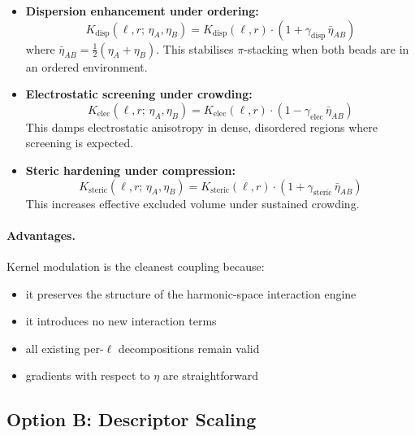 \documentclass[11pt]{article}
\begin{document}
\begin{itemize}
    \item \textbf{Dispersion enhancement under ordering:}
    \begin{equation}
        K_{\mathrm{disp}}(\ell, r;\, \eta_A, \eta_B)
        = K_{\mathrm{disp}}(\ell, r)
        \cdot \left(1 + \gamma_{\mathrm{disp}}\,
        \bar{\eta}_{AB}\right)
    \end{equation}
    where $\bar{\eta}_{AB} = \tfrac{1}{2}(\eta_A + \eta_B)$.
    This stabilises $\pi$-stacking when both beads are in an ordered
    environment.

    \item \textbf{Electrostatic screening under crowding:}
    \begin{equation}
        K_{\mathrm{elec}}(\ell, r;\, \eta_A, \eta_B)
        = K_{\mathrm{elec}}(\ell, r)
        \cdot \left(1 - \gamma_{\mathrm{elec}}\,
        \bar{\eta}_{AB}\right)
    \end{equation}
    This damps electrostatic anisotropy in dense, disordered regions
    where screening is expected.

    \item \textbf{Steric hardening under compression:}
    \begin{equation}
        K_{\mathrm{steric}}(\ell, r;\, \eta_A, \eta_B)
        = K_{\mathrm{steric}}(\ell, r)
        \cdot \left(1 + \gamma_{\mathrm{steric}}\,
        \bar{\eta}_{AB}\right)
    \end{equation}
    This increases effective excluded volume under sustained crowding.
\end{itemize}

\paragraph{Advantages.}
Kernel modulation is the cleanest coupling because:
\begin{itemize}
    \item it preserves the structure of the harmonic-space interaction engine
    \item it introduces no new interaction terms
    \item all existing per-$\ell$ decompositions remain valid
    \item gradients with respect to $\eta$ are straightforward
\end{itemize}

\subsection{Option B: Descriptor Scaling}
\end{document}
